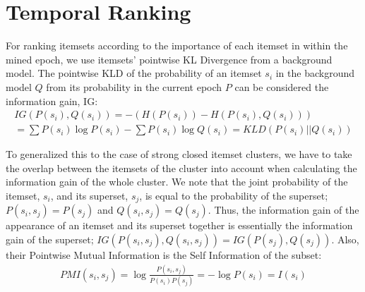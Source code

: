 \documentclass{sig-alternate}
\begin{document}

\section{Temporal Ranking}
\label{sec:rank}
For ranking itemsets according to the importance of each itemset in within the mined epoch, we use itemsets' pointwise KL Divergence from a background model. The pointwise KLD of the probability of an itemset $s_i$ in the background model $Q$ from its probability in the current epoch $P$ can be considered the information gain, IG: 
\begin{multline}IG(P(s_i),Q(s_i))  = - (H(P(s_i)) - H(P(s_i),Q(s_i))) \\ = \sum{P(s_i) \log{P(s_i)}} - \sum{P(s_i) \log{Q(s_i)}}  = KLD(P(s_i)||Q(s_i))\end{multline}

To generalized this to the case of strong closed itemset clusters, we have to take the overlap between the itemsets of the cluster into account when calculating the information gain of the whole cluster.
We note that the joint probability of the itemset, $s_i$, and its superset, $s_j$, is equal to the probability of the superset; $P(s_i,s_j) = P(s_j)$ and $Q(s_i,s_j) = Q(s_j)$. 
Thus, the information gain of the appearance of an itemset and its superset together is essentially the information gain of the superset; $IG(P(s_i,s_j),Q(s_i,s_j)) = IG(P(s_j),Q(s_j))$.  Also, their Pointwise Mutual Information is the Self Information of the subset:
\begin{multline}
PMI(s_i, s_j) = \log{ \frac{P(s_i,s_j)}{P(s_i)P(s_j)} } = -\log{P(s_i)} = I(s_i)
\end{multline}
\end{document}
